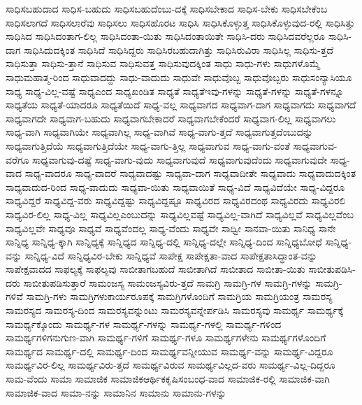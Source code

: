 {ಸಾಧಿಸಬಹುದಾದ
ಸಾಧಿಸ-ಬಹುದು
ಸಾಧಿಸಬಹುದೆಂಬು-ದಕ್ಕೆ
ಸಾಧಿಸಬೇಕಾದ
ಸಾಧಿಸ-ಬೇಕು
ಸಾಧಿಸಬೇಕೆಂಬ
ಸಾಧಿಸಲಾಗದೆ
ಸಾಧಿಸಲಾರೆವು
ಸಾಧಿಸಲು
ಸಾಧಿಸಹೊರಟ
ಸಾಧಿಸಿ
ಸಾಧಿಸಿಕೊಳ್ಳುತ್ತ
ಸಾಧಿಸಿಕೊಳ್ಳುವುದ-ರಲ್ಲಿ
ಸಾಧಿಸಿತ್ತು
ಸಾಧಿಸಿದ
ಸಾಧಿಸಿದಂತಾಗ-ಲಿಲ್ಲ
ಸಾಧಿಸಿದಂತಾ-ಯಿತು
ಸಾಧಿಸಿದಂತಾಯಿತೇ
ಸಾಧಿಸಿ-ದರು
ಸಾಧಿಸಿದವರೆಲ್ಲರೂ
ಸಾಧಿಸಿ-ದಾಗ
ಸಾಧಿಸಿದುದಕ್ಕಿಂತ
ಸಾಧಿಸಿದೆ
ಸಾಧಿಸಿದ್ದರು
ಸಾಧಿಸಿರಬಹುದಾಗಿತ್ತು
ಸಾಧಿಸಿರುವಿರಾ
ಸಾಧಿಸಿಲ್ಲ
ಸಾಧಿಸು-ತ್ತದೆ
ಸಾಧಿಸುತ್ತಾ
ಸಾಧಿಸು-ತ್ತಾನೆ
ಸಾಧಿಸುವ
ಸಾಧಿಸುವತ್ತ
ಸಾಧಿಸುವುದಕ್ಕಿಂತ
ಸಾಧು
ಸಾಧು-ಗಳು
ಸಾಧುಗಳೊಮ್ಮೆ
ಸಾಧುಮಹಾತ್ಮ-ರಿಂದ
ಸಾಧುವಾದದ್ದು
ಸಾಧು-ವಾದುದು
ಸಾಧುವೇ
ಸಾಧುವೊಬ್ಬ
ಸಾಧುವೊಬ್ಬರು
ಸಾಧುಸಂನ್ಯಾಸಿಯೂ
ಸಾಧ್ಯ
ಸಾಧ್ಯ-ವಿಲ್ಲ-ವಷ್ಟೆ
ಸಾಧ್ಯಎಂದ
ಸಾಧ್ಯಖಂಡಿತ
ಸಾಧ್ಯತೆ
ಸಾಧ್ಯತೆಇವು-ಗಳನ್ನು
ಸಾಧ್ಯತೆ-ಗಳನ್ನು
ಸಾಧ್ಯತೆ-ಗಳನ್ನೂ
ಸಾಧ್ಯತೆಯ
ಸಾಧ್ಯತೆ-ಯಾದರೂ
ಸಾಧ್ಯತೆಯಿದೆ
ಸಾಧ್ಯ-ವಲ್ಲ
ಸಾಧ್ಯವಾಗದ
ಸಾಧ್ಯವಾಗ-ದಾಗ
ಸಾಧ್ಯವಾಗದು
ಸಾಧ್ಯವಾಗದೆ
ಸಾಧ್ಯವಾಗದೇ
ಸಾಧ್ಯವಾಗ-ಬಹುದು
ಸಾಧ್ಯವಾಗಬೇಕಾದರೆ
ಸಾಧ್ಯವಾಗಬೇಕೆಂದರೆ
ಸಾಧ್ಯವಾಗ-ಲಿಲ್ಲ
ಸಾಧ್ಯವಾಗಲು
ಸಾಧ್ಯ-ವಾಗಿ
ಸಾಧ್ಯವಾಗಿಯೇ
ಸಾಧ್ಯವಾಗಿಲ್ಲ
ಸಾಧ್ಯ-ವಾಗಿವೆ
ಸಾಧ್ಯ-ವಾಗು-ತ್ತದೆ
ಸಾಧ್ಯವಾಗುತ್ತದೆಂಬುದನ್ನು
ಸಾಧ್ಯವಾಗುತ್ತಿದೆಯೆ
ಸಾಧ್ಯವಾಗುತ್ತಿದೆಯೇ
ಸಾಧ್ಯ-ವಾಗು-ತ್ತಿಲ್ಲ
ಸಾಧ್ಯವಾಗುವ
ಸಾಧ್ಯ-ವಾಗು-ವಂತೆ
ಸಾಧ್ಯವಾಗುವ-ವರೆಗೂ
ಸಾಧ್ಯವಾಗುವು-ದಷ್ಟೆ
ಸಾಧ್ಯ-ವಾಗು-ವುದು
ಸಾಧ್ಯವಾಗುವುದೆ
ಸಾಧ್ಯವಾಗುವುದೆಂದು
ಸಾಧ್ಯವಾಗುವುದೇ
ಸಾಧ್ಯ-ವಾದ
ಸಾಧ್ಯ-ವಾದರೂ
ಸಾಧ್ಯ-ವಾದರೆ
ಸಾಧ್ಯವಾದಷ್ಟು
ಸಾಧ್ಯವಾ-ದಾಗ
ಸಾಧ್ಯವಾದೀತೇ
ಸಾಧ್ಯವಾದು
ಸಾಧ್ಯವಾದುದಕ್ಕಿಂತ
ಸಾಧ್ಯವಾದುದ-ರಿಂದ
ಸಾಧ್ಯ-ವಾದುದು
ಸಾಧ್ಯವಾ-ಯಿತು
ಸಾಧ್ಯವಾಯಿತೆ
ಸಾಧ್ಯ-ವಿದೆ
ಸಾಧ್ಯವಿದೆಯೇ
ಸಾಧ್ಯ-ವಿದ್ದರೂ
ಸಾಧ್ಯವಿದ್ದರೆ
ಸಾಧ್ಯವಿದ್ದ-ವರು
ಸಾಧ್ಯವಿದ್ದಷ್ಟು
ಸಾಧ್ಯವಿದ್ದಷ್ಟೂ
ಸಾಧ್ಯವಿರದ
ಸಾಧ್ಯವಿರದಂಥ
ಸಾಧ್ಯವಿರದು
ಸಾಧ್ಯವಿರಲಿ
ಸಾಧ್ಯವಿರ-ಲಿಲ್ಲ
ಸಾಧ್ಯ-ವಿಲ್ಲ
ಸಾಧ್ಯವಿಲ್ಲಎಂಬುದನ್ನು
ಸಾಧ್ಯವಿಲ್ಲವಷ್ಟೆ
ಸಾಧ್ಯವಿಲ್ಲ-ವಾಗಿದೆ
ಸಾಧ್ಯವಿಲ್ಲವೆ
ಸಾಧ್ಯವಿಲ್ಲವೆಂಬ
ಸಾಧ್ಯವಿಲ್ಲವೇ
ಸಾಧ್ಯವೂ
ಸಾಧ್ಯವೆ
ಸಾಧ್ಯವೆಂದಲ್ಲ
ಸಾಧ್ಯ-ವೆಂದು
ಸಾಧ್ಯವೇ
ಸಾಧ್ವೀ
ಸಾನವಾ-ಯಿತು
ಸಾನಿಧ್ಯ
ಸಾನೇ
ಸಾನ್ನಿಧ್ಯ
ಸಾನ್ನಿಧ್ಯ-ಕ್ಕಾಗಿ
ಸಾನ್ನಿಧ್ಯಕ್ಕೆ
ಸಾನ್ನಿಧ್ಯದ
ಸಾನ್ನಿಧ್ಯ-ದಲ್ಲಿ
ಸಾನ್ನಿಧ್ಯ-ದಲ್ಲೇ
ಸಾನ್ನಿಧ್ಯ-ದಿಂದ
ಸಾನ್ನಿಧ್ಯಬೋಧೆ
ಸಾನ್ನಿಧ್ಯ-ವನ್ನು
ಸಾನ್ನಿಧ್ಯ-ವಿದೆ
ಸಾನ್ನಿಧ್ಯವಿರ-ಬೇಕು
ಸಾನ್ನಿಧ್ಯವೆ
ಸಾಪೇಕ್ಷ
ಸಾಪೇಕ್ಷತಾ-ವಾದ
ಸಾಪೇಕ್ಷತಾಸಿದ್ಧಾಂತ-ವನ್ನು
ಸಾಪೇಕ್ಷವಾದದ
ಸಾಫಲ್ಯಕ್ಕೆ
ಸಾಫಲ್ಯವು
ಸಾಬೀತಾಗಬಹುದೆ
ಸಾಬೀತಾಗಿದೆ
ಸಾಬೀತಾದ
ಸಾಬೀತಾ-ಯಿತು
ಸಾಬೀತುಪಡಿಸಿ-ದರು
ಸಾಬೀತುಪಡಿಸುತ್ತಾರೆ
ಸಾಮಂಜಸ್ಯ
ಸಾಮಂಜಸ್ಯವಿರು-ತ್ತದೆ
ಸಾಮಗ್ರಿ
ಸಾಮಗ್ರಿ-ಗಳ
ಸಾಮಗ್ರಿ-ಗಳನ್ನು
ಸಾಮಗ್ರಿ-ಗಳಿವೆ
ಸಾಮಗ್ರಿ-ಗಳು
ಸಾಮಗ್ರಿಗಳುಕಾರ್ಯರೂಪಕ್ಕೆ
ಸಾಮಗ್ರಿಗಳೊಂದಿಗೆ
ಸಾಮಗ್ರಿಯ
ಸಾಮಗ್ರಿಯಂತ್ರ
ಸಾಮರಸ್ಯ
ಸಾಮರಸ್ಯದ
ಸಾಮರಸ್ಯ-ದಿಂದ
ಸಾಮರಸ್ಯವನ್ನುಂಟು
ಸಾಮರಸ್ಯವನ್ನೇರ್ಪಡಿಸಿ
ಸಾಮರಸ್ಯವು
ಸಾಮರ್ಥ್ಯ
ಸಾಮರ್ಥ್ಯಕ್ಕೆ
ಸಾಮರ್ಥ್ಯಕ್ಕೊಂದು
ಸಾಮರ್ಥ್ಯ-ಗಳ
ಸಾಮರ್ಥ್ಯ-ಗಳನ್ನು
ಸಾಮರ್ಥ್ಯ-ಗಳಲ್ಲಿ
ಸಾಮರ್ಥ್ಯ-ಗಳಿಂದ
ಸಾಮರ್ಥ್ಯಗಳಿಗನುಗುಣ-ವಾಗಿ
ಸಾಮರ್ಥ್ಯ-ಗಳಿಗೆ
ಸಾಮರ್ಥ್ಯ-ಗಳೂ
ಸಾಮರ್ಥ್ಯಗಳೇನು
ಸಾಮರ್ಥ್ಯಗಳೊಂದಿಗೆ
ಸಾಮರ್ಥ್ಯದ
ಸಾಮರ್ಥ್ಯ-ದಲ್ಲಿ
ಸಾಮರ್ಥ್ಯ-ದಿಂದ
ಸಾಮರ್ಥ್ಯವನ್ನೀಯುವ
ಸಾಮರ್ಥ್ಯ-ವನ್ನು
ಸಾಮರ್ಥ್ಯ-ವಿದ್ದರೂ
ಸಾಮರ್ಥ್ಯವಿರ-ಲಿಲ್ಲ
ಸಾಮರ್ಥ್ಯವಿರು-ತ್ತದೆ
ಸಾಮರ್ಥ್ಯವಿರುವ
ಸಾಮರ್ಥ್ಯವಿಲ್ಲದ-ವರು
ಸಾಮರ್ಥ್ಯ-ವಿಲ್ಲ-ದಿದ್ದರೂ
ಸಾಮ-ವೆಂದು
ಸಾಮಾ
ಸಾಮಾಜಿಕ
ಸಾಮಾಜಿಕಆರ್ಥಿಕಕೃಷಿಸಂಬಂಧ-ವಾದ
ಸಾಮಾಜಿಕ-ರಲ್ಲಿ
ಸಾಮಾಜಿಕ-ವಾಗಿ
ಸಾಮಾಜಿಕ-ವಾದ
ಸಾಮಾ-ನನ್ನು
ಸಾಮಾನಿನ
ಸಾಮಾನು
ಸಾಮಾನು-ಗಳನ್ನು
}
